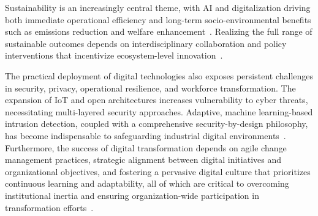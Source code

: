 \documentclass[sigconf]{acmart}
\begin{document}
Sustainability is an increasingly central theme, with AI and digitalization driving both immediate operational efficiency and long-term socio-environmental benefits such as emissions reduction and welfare enhancement~\cite{ref90}. Realizing the full range of sustainable outcomes depends on interdisciplinary collaboration and policy interventions that incentivize ecosystem-level innovation~\cite{ref88}.

The practical deployment of digital technologies also exposes persistent challenges in security, privacy, operational resilience, and workforce transformation. The expansion of IoT and open architectures increases vulnerability to cyber threats, necessitating multi-layered security approaches. Adaptive, machine learning-based intrusion detection, coupled with a comprehensive security-by-design philosophy, has become indispensable to safeguarding industrial digital environments~\cite{ref10}\cite{ref92}. Furthermore, the success of digital transformation depends on agile change management practices, strategic alignment between digital initiatives and organizational objectives, and fostering a pervasive digital culture that prioritizes continuous learning and adaptability, all of which are critical to overcoming institutional inertia and ensuring organization-wide participation in transformation efforts~\cite{ref25}\cite{ref31}\cite{ref35}.
\end{document}
